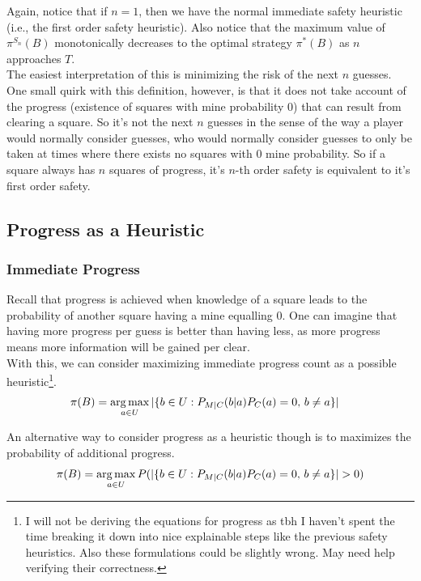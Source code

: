 Again, notice that if $n=1$, then we have the normal immediate safety heuristic (i.e., the first order safety heuristic). Also notice that the maximum value of $\pi^{S_n}(B)$ monotonically decreases to the optimal strategy $\pi^*(B)$ as $n$ approaches $T$.\\

The easiest interpretation of this is minimizing the risk of the next $n$ guesses. One small quirk with this definition, however, is that it does not take account of the progress (existence of squares with mine probability 0) that can result from clearing a square. So it's not the next $n$ guesses in the sense of the way a player would normally consider guesses, who would normally consider guesses to only be taken at times where there exists no squares with 0 mine probability. So if a square always has $n$ squares of progress, it's $n$-th order safety is equivalent to it's first order safety.\\

\subsection{Progress as a Heuristic}
\subsubsection*{Immediate Progress}

Recall that progress is achieved when knowledge of a square leads to the probability of another square having a mine equalling 0. One can imagine that having more progress per guess is better than having less, as more progress means more information will be gained per clear.\\

With this, we can consider maximizing immediate progress count as a possible heuristic\footnote{I will not be deriving the equations for progress as tbh I haven't spent the time breaking it down into nice explainable steps like the previous safety heuristics. Also these formulations could be slightly wrong. May need help verifying their correctness.}. \begin{align*}
    \pi(B)&=\mathop{\mathrm{arg\,max}}\limits_{a\in U}|\{b\in U:P_{M|C}(b|a)P_C(a)=0,\,b\neq a\}|
\end{align*}

An alternative way to consider progress as a heuristic though is to maximizes the probability of additional progress. \begin{align*}
    \pi(B)&=\argmax_{a\in U}P(|\{b\in U:P_{M|C}(b|a)P_C(a)=0,\,b\neq a\}|>0)\\
\end{align*}

